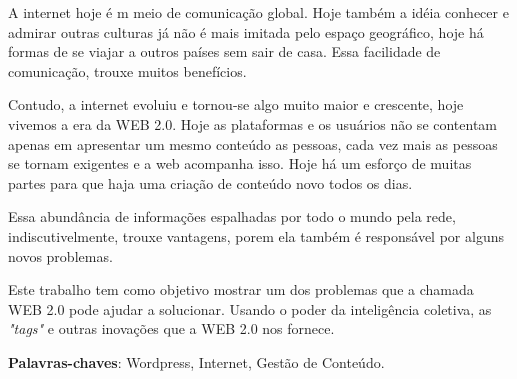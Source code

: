 \documentclass[
	12pt,				%
	openright,			%
	twoside,			%
	a4paper,			%
	Times,
	brazil,				%
	]{abntex2}
\begin{document}
\setlength{\absparsep}{18pt} %
\begin{resumo}
	\par
	A internet hoje é m meio de comunicação global. Hoje também a idéia conhecer e admirar outras culturas já não é mais imitada pelo espaço geográfico, hoje há formas de se viajar a outros países sem sair de casa. Essa facilidade de comunicação, trouxe muitos benefícios.
	\par
	Contudo, a internet evoluiu e tornou-se algo muito maior e crescente, hoje vivemos a era da WEB 2.0. Hoje as plataformas e os usuários não se contentam apenas em apresentar um mesmo conteúdo as pessoas, cada vez mais as pessoas se tornam exigentes e a web acompanha isso. Hoje há um esforço de muitas partes para que haja uma criação de conteúdo novo todos os dias.
	\par
	Essa abundância de informações espalhadas por todo o mundo pela rede, indiscutivelmente, trouxe vantagens, porem ela também é responsável por alguns novos problemas.
	\par
	Este trabalho tem como objetivo mostrar um dos problemas que a chamada WEB 2.0 pode ajudar a solucionar. Usando o poder da inteligência coletiva, as \textit{"tags"} e outras inovações que a WEB 2.0 nos fornece.
	\par
	\textbf{Palavras-chaves}: Wordpress, Internet, Gestão de Conteúdo.
\end{resumo}

%
% 



\end{document}

